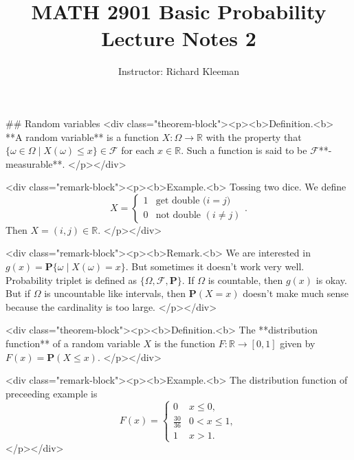


\title{MATH 2901 Basic Probability Lecture Notes 2}
\author{Instructor: Richard Kleeman}
\date{}
\maketitle


## Random variables
<div class="theorem-block"><p><b>Definition.<b> 
**A random variable** is a function $X: \Omega \to \mathbb{R}$ with the property that $\{ \omega\in \Omega \;\vert\; X(\omega) \leq x\} \in \mathcal{F}$ for each $x \in \mathbb{R}$. Such a function is said to be $\mathbf{\mathcal{F}}$**-measurable**. 
</p></div>

<div class="remark-block"><p><b>Example.<b> 
Tossing two dice. We define 
$$\begin{equation}
    X = \begin{cases} 1 & \text{get double ($i=j$)} \\ 0 & \text{not double $(i\neq j)$} \end{cases}.
\end{equation}$$
Then $X = (i,j) \in \mathbb{R}$.
</p></div>

<div class="remark-block"><p><b>Remark.<b> 
We are interested in $g(x) = \mathbf{P}\{ \omega \;\vert\; X(\omega) = x \}$. But sometimes it doesn't work very well. Probability triplet is defined as $\{ \Omega, \mathcal{F}, \mathbf{P} \}$. If $\Omega$ is countable, then $g(x)$ is okay. But if $\Omega$ is uncountable like intervals, then $\mathbf{P}(X=x)$ doesn't make much sense because the cardinality is too large.
</p></div>

<div class="theorem-block"><p><b>Definition.<b> 
The **distribution function** of a random variable $X$ is the function $F: \mathbb{R} \to 
[0, 1]$ given by $F(x) = \mathbf{P}(X \leq x)$. 
</p></div>

<div class="remark-block"><p><b>Example.<b> 
The distribution function of preceeding example is 
$$\begin{equation}
    F(x) = \begin{cases} 0 & x \leq 0, \\ \frac{30}{36} & 0 < x \leq 1, \\ 1 & x > 1. \end{cases}
\end{equation}$$
</p></div>


